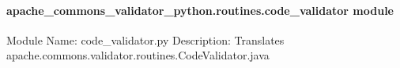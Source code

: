 \documentclass[letterpaper,10pt,english]{sphinxmanual}
\begin{document}
\paragraph{apache\_commons\_validator\_python.routines.code\_validator module}
\label{\detokenize{apache_commons_validator_python.routines:module-apache_commons_validator_python.routines.code_validator}}\label{\detokenize{apache_commons_validator_python.routines:apache-commons-validator-python-routines-code-validator-module}}
\sphinxAtStartPar
Module Name: code\_validator.py
Description: Translates apache.commons.validator.routines.CodeValidator.java
\end{document}
